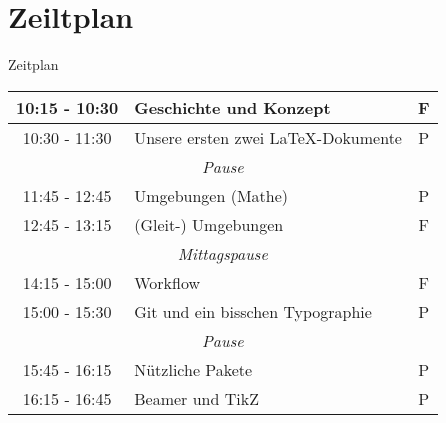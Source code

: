 \documentclass[11pt]{beamer}
\begin{document}
\section{Zeiltplan}
\begin{frame}[fragile]{Zeitplan}
\small{
	\begin{table}
	\centering
	\begin{tabular}{c|l|c}
	\toprule
	10:15 - 10:30 & Geschichte und Konzept & F\\
	\midrule
	10:30 - 11:30 & Unsere ersten zwei \LaTeX -Dokumente & P\\
	\midrule
	\multicolumn{3}{c}{\textit{Pause}}\\
	\midrule
	11:45 - 12:45 & Umgebungen (Mathe) & P\\
	\midrule
	12:45 - 13:15 & (Gleit-) Umgebungen & F\\
	\midrule
	\multicolumn{3}{c}{\textit{Mittagspause}}\\
	\midrule
	14:15 - 15:00 & Workflow & F\\
	\midrule
	15:00 - 15:30 & Git und ein bisschen Typographie & P\\
	\midrule
	\multicolumn{3}{c}{\textit{Pause}}\\
	\midrule
	15:45 - 16:15 & Nützliche Pakete & P\\
	\midrule
	16:15 - 16:45 & Beamer und TikZ & P\\
	\bottomrule
	\end{tabular}
	\end{table}
}
\end{frame}
\end{document}
